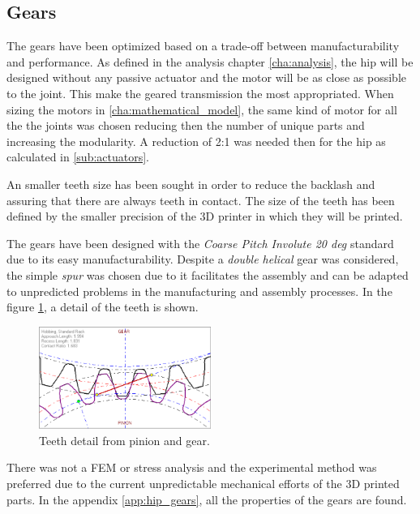 \subsection{Gears} %
\label{sub:gears}
The gears have been optimized based on a trade-off between manufacturability and performance.
As defined in the analysis chapter \ref{cha:analysis}, the hip will be designed without any passive actuator and the motor will be as close as possible to the joint.
This make the geared transmission the most appropriated.
When sizing the motors in \ref{cha:mathematical_model}, the same kind of motor for all the the joints was chosen reducing then the number of unique parts and increasing the modularity.
A reduction of 2:1 was needed then for the hip as calculated in \ref{sub:actuators}.

An smaller teeth size has been sought in order to reduce the backlash and assuring that there are always teeth in contact.
The size of the teeth has been defined by the smaller precision of the 3D printer in which they will be printed.

The gears have been designed with the \textit{Coarse Pitch Involute 20 deg} standard due to its easy manufacturability.
Despite a \textit{double helical} gear was considered, the simple \textit{spur} was chosen due to it facilitates the assembly and can be adapted to unpredicted problems in the manufacturing and assembly processes. 
In the figure \ref{fig:teeth_detail}, a detail of the teeth is shown.

\begin{figure}[ht!]
  \centering
  \includegraphics[width=0.5\textwidth]{figures/hip_gears}
  \caption{Teeth detail from pinion and gear.}
  \label{fig:teeth_detail}
\end{figure}

There was not a FEM or stress analysis and the experimental method was preferred due to the current unpredictable mechanical efforts of the 3D printed parts. In the appendix \ref{app:hip_gears}, all the properties of the gears are found.

